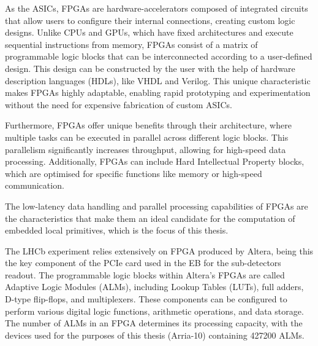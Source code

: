 As the ASICs, FPGAs are hardware-accelerators composed of integrated circuits that allow users to configure their internal connections, creating custom logic designs. Unlike CPUs and GPUs, which have fixed architectures and execute sequential instructions from memory, FPGAs consist of a matrix of programmable logic blocks that can be interconnected according to a user-defined design. This design can be constructed by the user with the help of hardware description languages (HDLs), like VHDL and Verilog. This unique characteristic makes FPGAs highly adaptable, enabling rapid prototyping and experimentation without the need for expensive fabrication of custom ASICs.

Furthermore, FPGAs offer unique benefits through their architecture, where multiple tasks can be executed in parallel across different logic blocks. This parallelism significantly increases throughput, allowing for high-speed data processing. Additionally, FPGAs can include Hard Intellectual Property blocks, which are optimised for specific functions like memory or high-speed communication.

The low-latency data handling and parallel processing capabilities of FPGAs are the characteristics that make them an ideal candidate for the computation of embedded local primitives, which is the focus of this thesis.

The LHCb experiment relies extensively on FPGA produced by Altera, being this the key component of the PCIe card used in the EB for the sub-detectors readout. The programmable logic blocks within Altera's FPGAs are called Adaptive Logic Modules (ALMs), including Lookup Tables (LUTs), full adders, D-type flip-flops, and multiplexers. These components can be configured to perform various digital logic functions, arithmetic operations, and data storage. The number of ALMs in an FPGA determines its processing capacity, with the devices used for the purposes of this thesis (Arria-10) containing 427200 ALMs.




